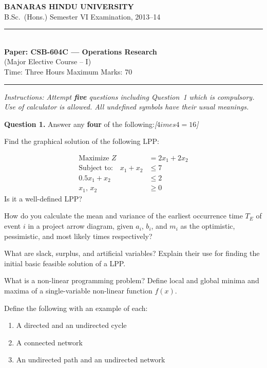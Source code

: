 \documentclass[11pt,a4paper]{article}
\newcommand{\pts}[1]{\hfill   \textit{[#1]}}
\begin{document}
\begin{center}
  {\large\bfseries BANARAS HINDU UNIVERSITY}\\[2pt]
  {\normalsize B.Sc.\ (Hons.) Semester VI Examination, 2013--14}\\[6pt]
  \rule{0.8\linewidth}{0.5pt}\\[6pt]
  {\large\bfseries Paper: CSB-604C --- Operations Research}\\[4pt]
  {\normalsize (Major Elective Course -- I)}\\[4pt]
  {\normalsize Time: Three Hours \hfill Maximum Marks: 70}
\end{center}

\rule{\linewidth}{0.4pt}

\smallskip



\noindent   \textit{Instructions: Attempt   \textbf{five} questions including Question~1 which is compulsory. Use of calculator is allowed. All undefined symbols have their usual meanings.}

\bigskip




\noindent   \textbf{Question 1.} Answer any   \textbf{four} of the following:\pts{$4 imes4=16$}

\begin{parts}
  \item Find the graphical solution of the following LPP:
  
\begin{align*}
     \text{Maximize } Z &= 2x_1 + 2x_2 \\
     \text{Subject to:}\quad x_1 + x_2 &\leq 7 \\
    0.5x_1 + x_2 &\leq 2 \\
    x_1,\, x_2 &\geq 0
  \end{align*}
  Is it a well-defined LPP?

  \item How do you calculate the mean and variance of the earliest occurrence time $T_E$ of event $i$ in a project arrow diagram, given $a_i$, $b_i$, and $m_i$ as the optimistic, pessimistic, and most likely times respectively?

  \item What are slack, surplus, and artificial variables? Explain their use for finding the initial basic feasible solution of a LPP.

  \item What is a non-linear programming problem? Define local and global minima and maxima of a single-variable non-linear function $f(x)$.

  \item Define the following with an example of each:
  
\begin{enumerate}[label=(\roman*)]
    \item A directed and an undirected cycle
    \item A connected network
    \item An undirected path and an undirected network
  \end{enumerate}
\end{parts}
\end{document}
